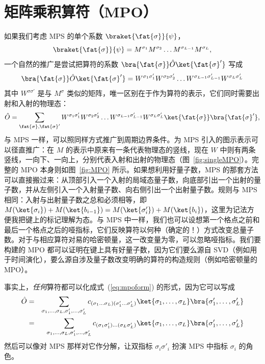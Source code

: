 \section{矩阵乘积算符（MPO）}
\label{sec:MPO}
如果我们考虑 MPS 的单个系数 $\braket{\fat{\sigma}}{\psi}$，
\[
\braket{\fat{\sigma}}{\psi} = M^{\sigma_1}M^{\sigma_2}\ldots M^{\sigma_{L-1}}M^{\sigma_L},
\]
一个自然的推广是尝试把算符的系数 $\bra{\fat{\sigma}} \hat{O} \ket{\fat{\sigma}'}$ 写成 \cite{VerstraeteRipoll04,McCulloch07,VerstraetePirvu08,Crosswhite08,Frowis10}
\begin{equation}
\bra{\fat{\sigma}} \hat{O} \ket{\fat{\sigma}'} = W^{\sigma_1\sigma'_1}W^{\sigma_2\sigma'_2} \ldots
W^{\sigma_{L-1}\sigma'_{L-1}}W^{\sigma_L\sigma'_L}
\end{equation}
其中 $W^{\sigma\sigma'}$ 是与 $M^{\sigma}$ 类似的矩阵，唯一区别在于作为算符的表示，它们同时需要出射和入射的物理态：
\begin{equation}
\hat{O} = \sum_{\fat{\sigma},\fat{\sigma}'} W^{\sigma_1\sigma'_1}W^{\sigma_2\sigma'_2} \ldots
W^{\sigma_{L-1}\sigma'_{L-1}}W^{\sigma_L\sigma'_L} \ket{\fat{\sigma}}\bra{\fat{\sigma}'} ,
\label{eq:mpoform}
\end{equation}
与 MPS 一样，可以照同样方式推广到周期边界条件。为 MPS 引入的图示表示可以径直推广：在 $M$ 的表示中原来有一条代表物理态的竖线，现在 $W$ 中则有两条竖线，一向下、一向上，分别代表入射和出射的物理态（图~\ref{fig:singleMPO}）。完整的 MPO 本身则如图~\ref{fig:MPO} 所示。如果想利用好量子数，MPS 的那套方法可以直接搬过来：从顶部引入一个入射的局域态量子数，向底部引出一个出射的量子数，并从左侧引入一个入射量子数、向右侧引出一个出射量子数。规则与 MPS 相同：入射与出射量子数之总和必须相等，即 $M(\ket{\sigma_i}) + M(\ket{b_{i-1}}) = M(\ket{\sigma'_i}) + M(\ket{b_{i}})$，这里为记法方便我把键上的标记理解为态。与 MPS 中一样，我们也可以设想第一个格点之前和最后一个格点之后的哑指标，它们反映算符以何种（确定的！）方式改变总量子数。对于与相应算符对易的哈密顿量，这一改变量为零，可以忽略哑指标。我们要构建的 MPO 都可以证明在键上具有好量子数，因为它们要么源自 SVD（例如用于时间演化），要么源自涉及量子数改变明确的算符的构造规则（例如哈密顿量的 MPO）。

事实上，{\em 任何}算符都可以化成式~(\ref{eq:mpoform}) 的形式，因为它可以写成
\begin{eqnarray}
\hat{O} &=& \sum_{\sigma_1,\ldots,\sigma_L,\sigma'_1,\ldots,\sigma'_L} c_{(\sigma_1\ldots\sigma_L)(\sigma'_1\ldots\sigma'_L)} \ket{\sigma_1,\ldots,\sigma_L} \bra{\sigma'_1,\ldots,\sigma'_L}  \nonumber \\ 
&=& \sum_{\sigma_1,\ldots,\sigma_L,\sigma'_1,\ldots,\sigma'_L} c_{(\sigma_1\sigma'_1) \ldots (\sigma_L \sigma'_L)} \ket{\sigma_1,\ldots,\sigma_L} \bra{\sigma'_1,\ldots,\sigma'_L}
\end{eqnarray}
然后可以像对 MPS 那样对它作分解，让双指标 $\sigma_i \sigma'_i$ 扮演 MPS 中指标 $\sigma_i$ 的角色。

